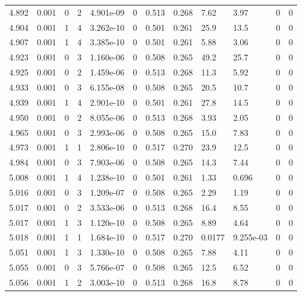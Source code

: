\documentclass[preview]{standalone}
\begin{document}
{{{{{{{{{{{{{\begin{tabular}{L{1.2cm}C{1.2cm} C{0.3cm}C{0.5cm} C{1.4cm}C{1.4cm} C{1.4cm}C{1.4cm} C{1.6cm}C{1.6cm} C{1.6cm}C{1.6cm}}
  4.892  &  0.001  & 0     &  2 &  4.901e-09  & 0  &  0.513&   0.268& 7.62 & 3.97   &  0 & 0  \\ 
  4.904  &  0.001  & 1     &  4 &  3.262e-10  & 0  &  0.501&   0.261& 25.9 & 13.5   &  0 & 0  \\ 
  4.907  &  0.001  & 1     &  4 &  3.385e-10  & 0  &  0.501&   0.261& 5.88 & 3.06   &  0 & 0  \\ 
  4.923  &  0.001  & 0     &  3 &  1.160e-06  & 0  &  0.508&   0.265& 49.2 & 25.7   &  0 & 0  \\ 
  4.925  &  0.001  & 0     &  2 &  1.459e-06  & 0  &  0.513&   0.268& 11.3 & 5.92   &  0 & 0  \\ 
  4.933  &  0.001  & 0     &  3 &  6.155e-08  & 0  &  0.508&   0.265& 20.5 & 10.7   &  0 & 0  \\ 
  4.939  &  0.001  & 1     &  4 &  2.901e-10  & 0  &  0.501&   0.261& 27.8 & 14.5   &  0 & 0  \\ 
  4.950  &  0.001  & 0     &  2 &  8.055e-06  & 0  &  0.513&   0.268& 3.93 & 2.05   &  0 & 0  \\ 
  4.965  &  0.001  & 0     &  3 &  2.993e-06  & 0  &  0.508&   0.265& 15.0 & 7.83   &  0 & 0  \\ 
  4.973  &  0.001  & 1     &  1 &  2.806e-10  & 0  &  0.517&   0.270& 23.9 & 12.5   &  0 & 0  \\ 
  4.984  &  0.001  & 0     &  3 &  7.903e-06  & 0  &  0.508&   0.265& 14.3 & 7.44   &  0 & 0  \\ 
  5.008  &  0.001  & 1     &  4 &  1.238e-10  & 0  &  0.501&   0.261& 1.33 & 0.696   &  0 & 0  \\ 
  5.016  &  0.001  & 0     &  3 &  1.209e-07  & 0  &  0.508&   0.265& 2.29 & 1.19   &  0 & 0  \\ 
  5.017  &  0.001  & 0     &  2 &  3.533e-06  & 0  &  0.513&   0.268& 16.4 & 8.55   &  0 & 0  \\ 
  5.017  &  0.001  & 1     &  3 &  1.120e-10  & 0  &  0.508&   0.265& 8.89 & 4.64   &  0 & 0  \\ 
  5.018  &  0.001  & 1     &  1 &  1.684e-10  & 0  &  0.517&   0.270& 0.0177 & 9.255e-03   &  0 & 0  \\ 
  5.051  &  0.001  & 1     &  3 &  1.330e-10  & 0  &  0.508&   0.265& 7.88 & 4.11   &  0 & 0  \\ 
  5.055  &  0.001  & 0     &  3 &  5.766e-07  & 0  &  0.508&   0.265& 12.5 & 6.52   &  0 & 0  \\ 
  5.056  &  0.001  & 1     &  2 &  3.003e-10  & 0  &  0.513&   0.268& 16.8 & 8.78   &  0 & 0  \\ 

\end{tabular}}}}}}}}}}}}}}
\end{document}
